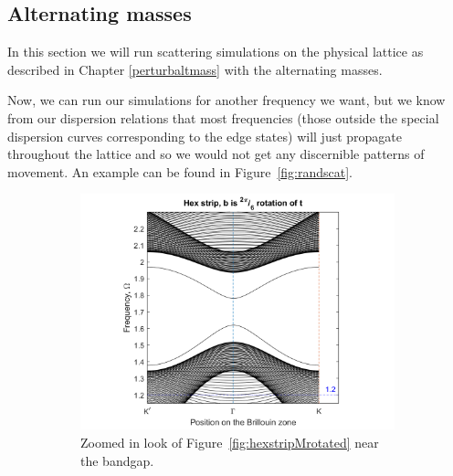 \subsection{Alternating masses}

In this section we will run scattering simulations on the physical lattice as
described in Chapter \ref{perturbaltmass} with the alternating masses.

Now, we can run our simulations for another frequency we want, but we know from
our dispersion relations that most frequencies (those outside the special
dispersion curves corresponding to the edge states) will just propagate
throughout the lattice and so we would not get any discernible patterns of
movement. An example can be found in Figure~\ref{fig:randscat}.

\begin{figure}
\centering
\begin{subfigure}[b]{.5\textwidth}
  \centering
  \includegraphics[width=1.1\linewidth]{imgs/hexstripperturbMrotatedrand.png}
  \caption{Zoomed in look of Figure~\ref{fig:hexstripMrotated} near the bandgap.}
\label{fig:sub1}
\end{subfigure}%
\begin{subfigure}[b]{.5\textwidth}
  \centering

\end{subfigure}
\end{figure}
